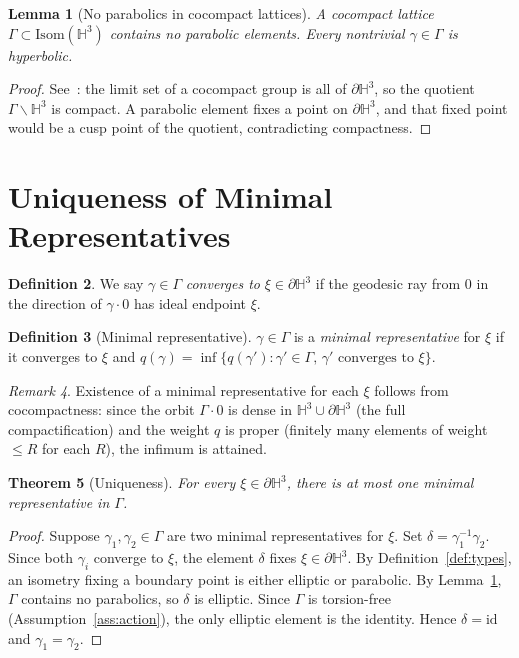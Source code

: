 \documentclass[12pt]{article}
\newtheorem{theorem}{Theorem}[section]
\newtheorem{lemma}[theorem]{Lemma}
\theoremstyle{definition}
\newtheorem{definition}[theorem]{Definition}
\theoremstyle{remark}
\newtheorem{remark}[theorem]{Remark}
\begin{document}
\begin{lemma}[No parabolics in cocompact lattices]\label{lem:nopar}
A cocompact lattice $\Gamma\subset\mathrm{Isom}(\mathbb{H}^3)$ contains
no parabolic elements. Every nontrivial $\gamma\in\Gamma$ is hyperbolic.
\end{lemma}
\begin{proof}
See~\cite[Corollary~12.3.5]{ratcliffe}: the limit set of a cocompact
group is all of $\partial\mathbb{H}^3$, so the quotient
$\Gamma\backslash\mathbb{H}^3$ is compact.  A parabolic element fixes
a point on $\partial\mathbb{H}^3$, and that fixed point would be a cusp
point of the quotient, contradicting compactness.
\end{proof}

\section{Uniqueness of Minimal Representatives}
\label{sec:uniqueness}

\begin{definition}\label{def:convergeto}
We say $\gamma\in\Gamma$ \emph{converges to} $\xi\in\partial\mathbb{H}^3$
if the geodesic ray from $0$ in the direction of $\gamma\cdot0$ has ideal
endpoint $\xi$.
\end{definition}

\begin{definition}[Minimal representative]\label{def:minimal}
$\gamma\in\Gamma$ is a \emph{minimal representative} for $\xi$ if it
converges to $\xi$ and
$q(\gamma)=\inf\{q(\gamma'):\gamma'\in\Gamma,\,\gamma'\text{ converges to }\xi\}$.
\end{definition}

\begin{remark}
Existence of a minimal representative for each $\xi$ follows from
cocompactness: since the orbit $\Gamma\cdot0$ is dense in
$\mathbb{H}^3\cup\partial\mathbb{H}^3$ (the full compactification) and
the weight $q$ is proper (finitely many elements of weight $\le R$ for
each $R$), the infimum is attained.
\end{remark}

\begin{theorem}[Uniqueness]\label{thm:uniqueness}
For every $\xi\in\partial\mathbb{H}^3$, there is at most one minimal
representative in $\Gamma$.
\end{theorem}

\begin{proof}
Suppose $\gamma_1,\gamma_2\in\Gamma$ are two minimal representatives for
$\xi$. Set $\delta=\gamma_1^{-1}\gamma_2$. Since both $\gamma_i$ converge
to $\xi$, the element $\delta$ fixes $\xi\in\partial\mathbb{H}^3$.
By Definition~\ref{def:types}, an isometry fixing a boundary point is
either elliptic or parabolic. By Lemma~\ref{lem:nopar}, $\Gamma$ contains
no parabolics, so $\delta$ is elliptic. Since $\Gamma$ is torsion-free
(Assumption~\ref{ass:action}), the only elliptic element is the identity.
Hence $\delta=\mathrm{id}$ and $\gamma_1=\gamma_2$.
\end{proof}
\end{document}
